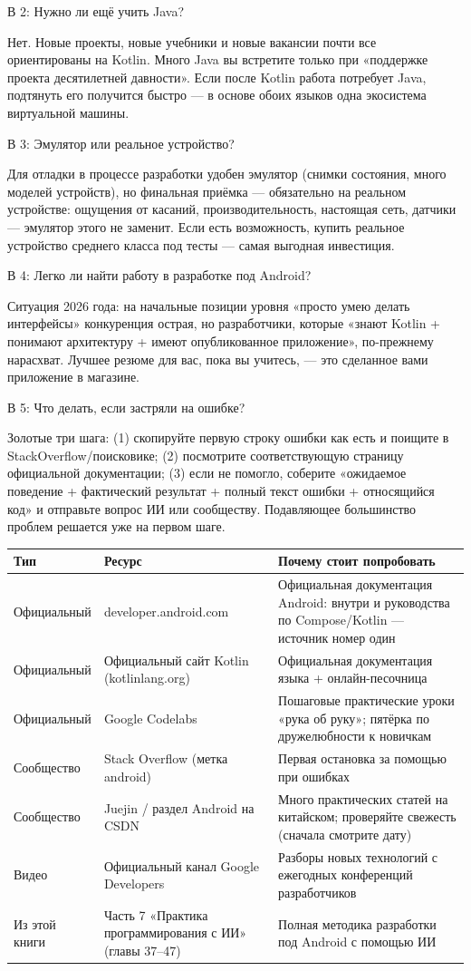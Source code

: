 В 2: Нужно ли ещё учить Java?

Нет. Новые проекты, новые учебники и новые вакансии почти все ориентированы на Kotlin. Много Java вы встретите только при «поддержке проекта десятилетней давности». Если после Kotlin работа потребует Java, подтянуть его получится быстро — в основе обоих языков одна экосистема виртуальной машины.

В 3: Эмулятор или реальное устройство?

Для отладки в процессе разработки удобен эмулятор (снимки состояния, много моделей устройств), но финальная приёмка — обязательно на реальном устройстве: ощущения от касаний, производительность, настоящая сеть, датчики — эмулятор этого не заменит. Если есть возможность, купить реальное устройство среднего класса под тесты — самая выгодная инвестиция.

В 4: Легко ли найти работу в разработке под Android?

Ситуация 2026 года: на начальные позиции уровня «просто умею делать интерфейсы» конкуренция острая, но разработчики, которые «знают Kotlin + понимают архитектуру + имеют опубликованное приложение», по-прежнему нарасхват. Лучшее резюме для вас, пока вы учитесь, — это сделанное вами приложение в магазине.

В 5: Что делать, если застряли на ошибке?

Золотые три шага: (1) скопируйте первую строку ошибки как есть и поищите в StackOverflow/поисковике; (2) посмотрите соответствующую страницу официальной документации; (3) если не помогло, соберите «ожидаемое поведение + фактический результат + полный текст ошибки + относящийся код» и отправьте вопрос ИИ или сообществу. Подавляющее большинство проблем решается уже на первом шаге.


\begin{center}
\begin{tabularx}{\linewidth}{|X|X|X|}
\hline
\textbf{Тип} & \textbf{Ресурс} & \textbf{Почему стоит попробовать} \tabularnewline
\hline
Официальный & developer.android.com & Официальная документация Android: внутри и руководства по Compose/Kotlin — источник номер один \tabularnewline
Официальный & Официальный сайт Kotlin (kotlinlang.org) & Официальная документация языка + онлайн-песочница \tabularnewline
Официальный & Google Codelabs & Пошаговые практические уроки «рука об руку»; пятёрка по дружелюбности к новичкам \tabularnewline
Сообщество & Stack Overflow (метка android) & Первая остановка за помощью при ошибках \tabularnewline
Сообщество & Juejin / раздел Android на CSDN & Много практических статей на китайском; проверяйте свежесть (сначала смотрите дату) \tabularnewline
Видео & Официальный канал Google Developers & Разборы новых технологий с ежегодных конференций разработчиков \tabularnewline
Из этой книги & Часть 7 «Практика программирования с ИИ» (главы 37–47) & Полная методика разработки под Android с помощью ИИ \tabularnewline
\hline
\end{tabularx}
\end{center}

